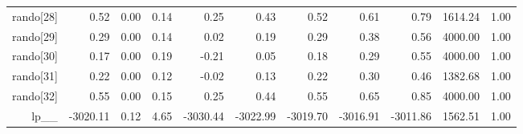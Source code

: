 \begin{table}[ht]
\begin{tabular}{rrrrrrrrrrr}
  rando[28] & 0.52 & 0.00 & 0.14 & 0.25 & 0.43 & 0.52 & 0.61 & 0.79 & 1614.24 & 1.00 \\ 
  rando[29] & 0.29 & 0.00 & 0.14 & 0.02 & 0.19 & 0.29 & 0.38 & 0.56 & 4000.00 & 1.00 \\ 
  rando[30] & 0.17 & 0.00 & 0.19 & -0.21 & 0.05 & 0.18 & 0.29 & 0.55 & 4000.00 & 1.00 \\ 
  rando[31] & 0.22 & 0.00 & 0.12 & -0.02 & 0.13 & 0.22 & 0.30 & 0.46 & 1382.68 & 1.00 \\ 
  rando[32] & 0.55 & 0.00 & 0.15 & 0.25 & 0.44 & 0.55 & 0.65 & 0.85 & 4000.00 & 1.00 \\ 
  lp\_\_ & -3020.11 & 0.12 & 4.65 & -3030.44 & -3022.99 & -3019.70 & -3016.91 & -3011.86 & 1562.51 & 1.00 \\ 
   \hline
\end{tabular}
\label{weifit_tab}
\end{table}
